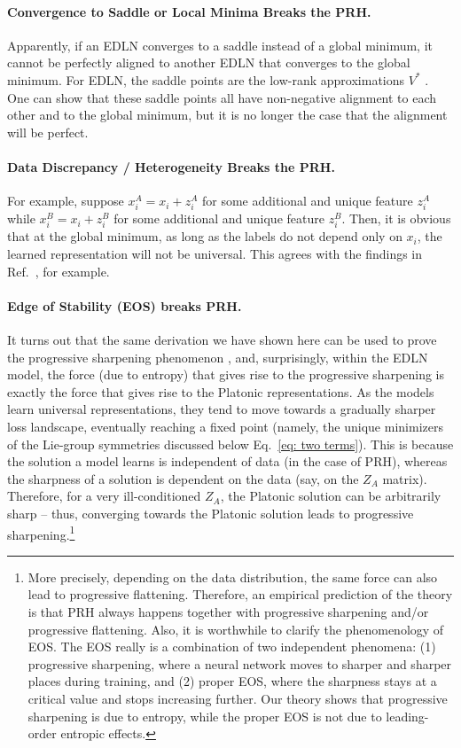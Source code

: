 \documentclass[11pt]{article}
\theoremstyle{plain}
\begin{document}
\paragraph{Convergence to Saddle or Local Minima Breaks the PRH.} Apparently, if an EDLN converges to a saddle instead of a global minimum, it cannot be perfectly aligned to another EDLN that converges to the global minimum. For EDLN, the saddle points are the low-rank approximations $V^*$ \cite{fukumizu2000local}. One can show that these saddle points all have non-negative alignment to each other and to the global minimum, but it is no longer the case that the alignment will be perfect. 

\paragraph{Data Discrepancy / Heterogeneity Breaks the PRH.} For example, suppose $x_i^A = x_i + z_i^A$ for some additional and unique feature $z_i^A$ while $x_i^B = x_i + z_i^B$ for some additional and unique feature $z_i^B$. Then, it is obvious that at the global minimum, as long as the labels do not depend only on $x_i$, the learned representation will not be universal. This agrees with the findings in Ref.~\cite{tjandrasuwita2025understanding}, for example.

\paragraph{Edge of Stability (EOS) breaks PRH.} It turns out that the same derivation we have shown here can be used to prove the progressive sharpening phenomenon \cite{cohen2021gradient}, and, surprisingly, within the EDLN model, the force (due to entropy) that gives rise to the progressive sharpening is exactly the force that gives rise to the Platonic representations. As the models learn universal representations, they tend to move towards a gradually sharper loss landscape, eventually reaching a fixed point (namely, the unique minimizers of the Lie-group symmetries discussed below Eq.~\eqref{eq: two terms}). This is because the solution a model learns is independent of data (in the case of PRH), whereas the sharpness of a solution is dependent on the data (say, on the $Z_A$ matrix). Therefore, for a very ill-conditioned $Z_A$, the Platonic solution can be arbitrarily sharp -- thus, converging towards the Platonic solution leads to progressive sharpening.\footnote{More precisely, depending on the data distribution, the same force can also lead to progressive flattening. Therefore, an empirical prediction of the theory is that PRH always happens together with progressive sharpening and/or progressive flattening. Also, it is worthwhile to clarify the phenomenology of EOS. The EOS really is a combination of two independent phenomena: (1) progressive sharpening, where a neural network moves to sharper and sharper places during training, and (2) proper EOS, where the sharpness stays at a critical value and stops increasing further. Our theory shows that progressive sharpening is due to entropy, while the proper EOS is not due to leading-order entropic effects.}
\end{document}
